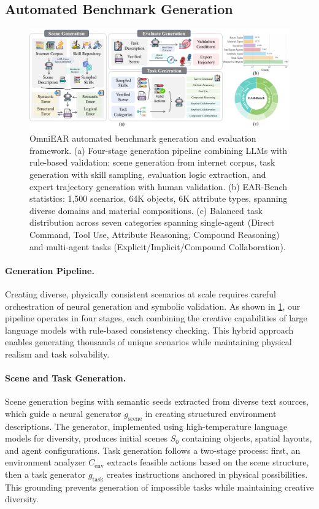 \subsection{Automated Benchmark Generation}

\begin{figure}
    \centering
    \includegraphics[width=1.0\textwidth,trim=0 13 0 0pt, clip]{figures/data_generation.pdf}
    \caption{OmniEAR automated benchmark generation and evaluation framework. (a) Four-stage generation pipeline combining LLMs with rule-based validation: scene generation from internet corpus, task generation with skill sampling, evaluation logic extraction, and expert trajectory generation with human validation. (b) EAR-Bench statistics: 1,500 scenarios, 64K objects, 6K attribute types, spanning diverse domains and material compositions. (c) Balanced task distribution across seven categories spanning single-agent (Direct Command, Tool Use, Attribute Reasoning, Compound Reasoning) and multi-agent tasks (Explicit/Implicit/Compound Collaboration).}
    \label{fig:data-generation-and-distribution}
\end{figure}


\paragraph{Generation Pipeline.}
Creating diverse, physically consistent scenarios at scale requires careful orchestration of neural generation and symbolic validation. As shown in \ref{fig:data-generation-and-distribution}, our pipeline operates in four stages, each combining the creative capabilities of large language models with rule-based consistency checking. This hybrid approach enables generating thousands of unique scenarios while maintaining physical realism and task solvability.

\paragraph{Scene and Task Generation.}
Scene generation begins with semantic seeds extracted from diverse text sources\citep{li2024datacomp}, which guide a neural generator $g_{\text{scene}}$ in creating structured environment descriptions. The generator, implemented using high-temperature language models for diversity, produces initial scenes $S_0$ containing objects, spatial layouts, and agent configurations. Task generation follows a two-stage process: first, an environment analyzer $C_{\text{env}}$ extracts feasible actions based on the scene structure, then a task generator $g_{\text{task}}$ creates instructions anchored in physical possibilities. This grounding prevents generation of impossible tasks while maintaining creative diversity.

